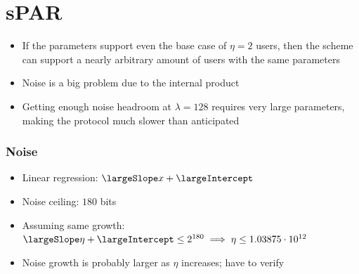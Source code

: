 \section{sPAR}
\begin{itemize}
    \item If the parameters support even the base case of $\eta = 2$ users, then the scheme can support a nearly arbitrary amount of users with the same parameters
    \item Noise is a big problem due to the internal product
    \item Getting enough noise headroom at $\lambda = 128$ requires very large parameters, making the protocol much slower than anticipated
\end{itemize}

\subsubsection{Noise}

\begin{itemize}
    \item Linear regression: $\largeSlope x + \largeIntercept$
    \item Noise ceiling: $180$ bits
    \item Assuming same growth: $\largeSlope \eta + \largeIntercept \leq 2^{180} \implies \eta \leq 1.03875\cdot10^{12}$ 
    \item Noise growth is probably larger as $\eta$ increases; have to verify
\end{itemize}


